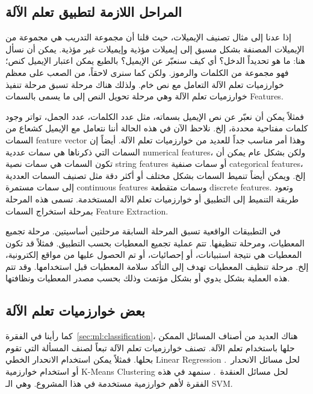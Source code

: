 \subsection{المراحل اللازمة لتطبيق تعلم الآلة}
\label{sec:ml:steps}
إذا عدنا إلى مثال تصنيف الإيميلات، حيث قلنا أن مجموعة التدريب هي مجموعة من الإيميلات المصنفة بشكل مسبق إلى إيميلات مؤذية وإيميلات غير مؤذية.
يمكن أن نسأل هنا: ما هو تحديداً الدخل؟ أي كيف سنعبّر عن الإيميل؟ بالطبع يمكن اعتبار الإيميل كنص؛ فهو مجموعة من الكلمات والرموز.
ولكن كما سنرى لاحقاً، من الصعب على معظم خوارزميات تعلم الآلة التعامل مع نص خام. ولذلك هناك مرحلة تسبق مرحلة تنفيذ خوارزميات تعلم الآلة
وهي مرحلة تحويل النص إلى ما يسمى بالسمات \textenglish{Features}.

فمثلاً يمكن أن نعبّر عن نص الإيميل بسماته، مثل عدد الكلمات، عدد الجمل،
تواتر وجود كلمات مفتاحية محددة، إلخ. نلاحظ الآن في هذه الحالة أننا نتعامل مع الإيميل كشعاع من السمات \textenglish{feature vector} وهذا أمر مناسب جداً
للعديد من خوارزميات تعلم الآلة. أيضاً إن السمات التي ذكرناها هي سمات عددية \textenglish{numerical features}، ولكن بشكل عام يمكن أن تكون السمات
هي سمات نصية \textenglish{string features} أو سمات صنفية \textenglish{categorical features}، إلخ. ويمكن أيضاً تنميط السمات بشكل مختلف أو أكثر دقة
مثل تصنيف السمات العددية إلى سمات مستمرة \textenglish{continuous features} وسمات متقطعة \textenglish{discrete features}. وتعود طريقة التنميط إلى
التطبيق أو خوارزميات تعلم الآلة المستخدمة. تسمى هذه المرحلة بمرحلة استخراج السمات \textenglish{Feature Extraction}.

في التطبيقات الواقعية تسبق المرحلة السابقة مرحلتين أساسيتين. مرحلة تجميع المعطيات، ومرحلة تنظيفها. تتم عملية تجميع المعطيات بحسب التطبيق.
فمثلاً قد تكون المعطيات هي نتيجة استبيانات، أو إحصائيات، أو تم الحصول عليها من مواقع إلكترونية، إلخ.
مرحلة تنظيف المعطيات تهدف إلى التأكد سلامة المعطيات قبل استخدامها. وقد تتم هذه العملية بشكل يدوي أو بشكل مؤتمت وذلك بحسب مصدر المعطيات ونظافتها.




\subsection{بعض خوارزميات تعلم الآلة}
\label{sec:ml:algs}
كما رأينا في الفقرة~\ref{sec:ml:classification}، هناك العديد من أصناف المسائل الممكن حلها باستخدام تعلم الآلة.
تصنف خوارزميات تعلم الآلة تبعاً لصنف المسألة التي تقوم بحلها. فمثلاً يمكن استخدام الانحدار الخطي
\textenglish{Linear Regression}
لحل مسائل الانحدار~\cite{hands-on}.
أو استخدام خوارزمية \textenglish{K-Means Clustering}  لحل مسائل العنقدة~\cite{hands-on}.
سنمهد في هذه الفقرة لأهم خوارزمية مستخدمة في هذا المشروع.
وهي الـ \textenglish{SVM}.


